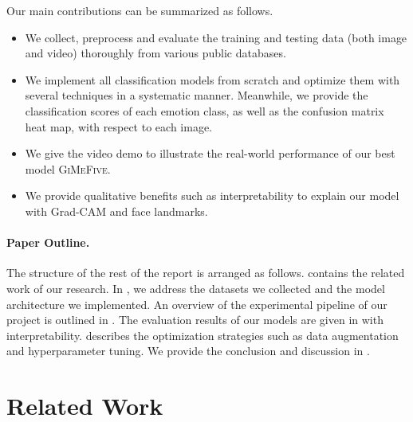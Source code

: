 Our main contributions can be summarized as follows. 
\begin{itemize}
  \item We collect, preprocess and evaluate the training and testing data 
  (both image and video) thoroughly from various public databases. 
  \item We implement all classification models from scratch and optimize them with several techniques in a systematic manner. 
  Meanwhile, we provide the classification scores of each emotion class, 
  as well as the confusion matrix heat map, with respect to each image. 
  \item We give the video demo to illustrate the real-world performance of our best model \textsc{GiMeFive}. 
  \item We provide qualitative benefits such as interpretability to explain our model with Grad-CAM and face landmarks.
\end{itemize}

\paragraph{Paper Outline.}
The structure of the rest of the report is arranged as follows. 
 contains the related work of our research. 
In , 
we address the datasets we collected and the model architecture we implemented. 
An overview of the experimental pipeline of our project is outlined in . 
The evaluation results of our models are given in  with interpretability. 
 describes the optimization strategies such as data augmentation and hyperparameter tuning. 
We provide the conclusion and discussion in . 

\section{Related Work}
\label{sec:related}


